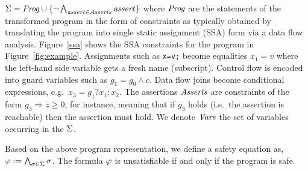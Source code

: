 $\Sigma=\mathit{Prog}\cup\{\neg \bigwedge_{\mathit{assert}\in\mathit{Asserts}} \mathit{assert}\}$
where $\mathit{Prog}$ are the statements of the transformed program in the
form of constraints as typically obtained by translating the program
into single static assignment (SSA) form via a data flow analysis.
%
Figure~\ref{ssa} shows the SSA constraints for the program in
Figure~\ref{fig:example}.
%
Assignments such as \texttt{x=v;} become equalities $x_1=v$ where the
left-hand side variable gets a fresh name (subscript).
%
Control flow is encoded into guard variables such as $g_1=g_0\wedge c$.
%
Data flow joins become conditional expressions, e.g.\ $x_3=g_1?x_1:x_2$.
%
The assertions $\mathit{Asserts}$ are constraints of the form $g_3
\Rightarrow z\geq 0$, for instance, meaning that if $g_3$ holds
(i.e.\ the assertion is reachable) then the assertion must hold.
%
We denote $\mathit{Vars}$ the set of variables occurring in the $\Sigma$.
%
%

% 

%
Based on the above program representation, we define a safety equation as, 
$\varphi:= \bigwedge_{\sigma\in\Sigma} \sigma$. The formula $\varphi$ is 
unsatisfiable if and only if the program is safe.

